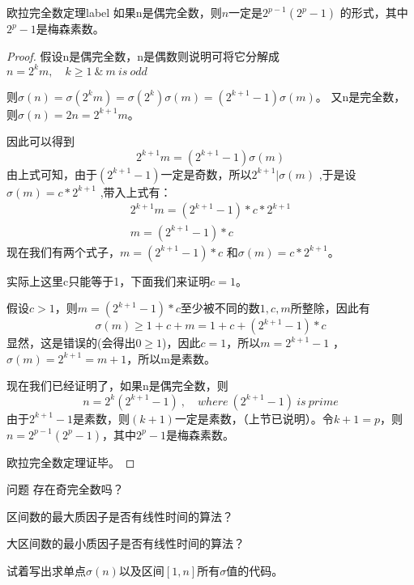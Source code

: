 \begin{theorem}{欧拉完全数定理}{label}
如果n是偶完全数，则$n$一定是$2^{p-1}(2^p-1)$ 的形式，其中$2^p-1$是梅森素数。
\end{theorem}

\begin{proof}
	假设n是偶完全数，n是偶数则说明可将它分解成$n=2^km,\quad k\ge 1 \ \&\ m\ is\ odd$
	
	则$\sigma(n)=\sigma(2^km)=\sigma(2^k)\sigma(m)=(2^{k+1}-1)\sigma(m)$。
	又n是完全数，则$\sigma(n)=2n=2^{k+1}m$。
	
	因此可以得到
	$$
	2^{k+1}m=(2^{k+1}-1)\sigma(m)
	$$
	由上式可知，由于$(2^{k+1}-1)$一定是奇数，所以$2^{k+1}| \sigma(m)$ ,于是设$\sigma(m)=c*2^{k+1}$ ,带入上式有：
	\begin{align*}
	2^{k+1}m=(2^{k+1}-1)*c*2^{k+1} \\
	m=(2^{k+1}-1)*c
	\end{align*}
	现在我们有两个式子，$m=(2^{k+1}-1)*c$ 和$\sigma(m)=c*2^{k+1}$。
	
	实际上这里c只能等于1，下面我们来证明$c=1$。
	
	假设$c>1$，则$m=(2^{k+1}-1)*c$至少被不同的数$1,c,m$所整除，因此有
	$$
	\sigma(m)\ge 1+c+m=1+c+(2^{k+1}-1)*c
	$$
	显然，这是错误的(会得出$0\ge 1$)，因此$c=1$，所以$m=2^{k+1}-1$  ，  $\sigma(m)=2^{k+1}=m+1$，所以m是素数。
	
	现在我们已经证明了，如果n是偶完全数，则
	$$
	n=2^k(2^{k+1}-1)\ ,\quad where \ (2^{k+1}-1)\ is \ prime
	$$
	由于$2^{k+1}-1$是素数，则$(k+1)$一定是素数，（上节已说明）。令$k+1=p$，则$n=2^{p-1}(2^p-1)$，其中$2^p-1$是梅森素数。
	
	欧拉完全数定理证毕。
\end{proof}

\vbox{}

\begin{custom}{问题}
	存在奇完全数吗？
\end{custom}






\vbox{}


\begin{problemset}
	\item 区间数的最大质因子是否有线性时间的算法？
	\item 大区间数的最小质因子是否有线性时间的算法？
	\item 试着写出求单点$\sigma(n)$以及区间$[1,n]$所有$\sigma$值的代码。
\end{problemset}